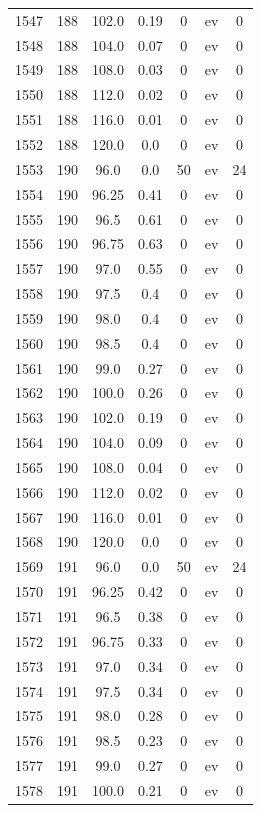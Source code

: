 \documentclass[12pt,a4paper]{article}
\begin{document}
\begin{tabular}{r|cccccc}
	1547 & 188 & 102.0 & 0.19 & 0 & ev & 0 \\
	1548 & 188 & 104.0 & 0.07 & 0 & ev & 0 \\
	1549 & 188 & 108.0 & 0.03 & 0 & ev & 0 \\
	1550 & 188 & 112.0 & 0.02 & 0 & ev & 0 \\
	1551 & 188 & 116.0 & 0.01 & 0 & ev & 0 \\
	1552 & 188 & 120.0 & 0.0 & 0 & ev & 0 \\
	1553 & 190 & 96.0 & 0.0 & 50 & ev & 24 \\
	1554 & 190 & 96.25 & 0.41 & 0 & ev & 0 \\
	1555 & 190 & 96.5 & 0.61 & 0 & ev & 0 \\
	1556 & 190 & 96.75 & 0.63 & 0 & ev & 0 \\
	1557 & 190 & 97.0 & 0.55 & 0 & ev & 0 \\
	1558 & 190 & 97.5 & 0.4 & 0 & ev & 0 \\
	1559 & 190 & 98.0 & 0.4 & 0 & ev & 0 \\
	1560 & 190 & 98.5 & 0.4 & 0 & ev & 0 \\
	1561 & 190 & 99.0 & 0.27 & 0 & ev & 0 \\
	1562 & 190 & 100.0 & 0.26 & 0 & ev & 0 \\
	1563 & 190 & 102.0 & 0.19 & 0 & ev & 0 \\
	1564 & 190 & 104.0 & 0.09 & 0 & ev & 0 \\
	1565 & 190 & 108.0 & 0.04 & 0 & ev & 0 \\
	1566 & 190 & 112.0 & 0.02 & 0 & ev & 0 \\
	1567 & 190 & 116.0 & 0.01 & 0 & ev & 0 \\
	1568 & 190 & 120.0 & 0.0 & 0 & ev & 0 \\
	1569 & 191 & 96.0 & 0.0 & 50 & ev & 24 \\
	1570 & 191 & 96.25 & 0.42 & 0 & ev & 0 \\
	1571 & 191 & 96.5 & 0.38 & 0 & ev & 0 \\
	1572 & 191 & 96.75 & 0.33 & 0 & ev & 0 \\
	1573 & 191 & 97.0 & 0.34 & 0 & ev & 0 \\
	1574 & 191 & 97.5 & 0.34 & 0 & ev & 0 \\
	1575 & 191 & 98.0 & 0.28 & 0 & ev & 0 \\
	1576 & 191 & 98.5 & 0.23 & 0 & ev & 0 \\
	1577 & 191 & 99.0 & 0.27 & 0 & ev & 0 \\
	1578 & 191 & 100.0 & 0.21 & 0 & ev & 0 \\

\end{tabular}
\end{document}
